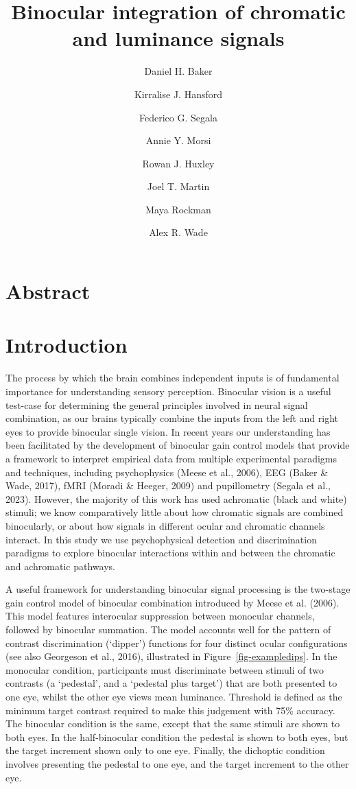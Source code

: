 \documentclass[
  letterpaper,
  DIV=11,
  numbers=noendperiod]{scrartcl}
\title{Binocular integration of chromatic and luminance signals}
\author{Daniel H. Baker \and Kirralise J. Hansford \and Federico G.
Segala \and Annie Y. Morsi \and Rowan J. Huxley \and Joel T.
Martin \and Maya Rockman \and Alex R. Wade}
\date{}
\begin{document}
\maketitle
\hypertarget{abstract}{%
\section{Abstract}\label{abstract}}

\hypertarget{introduction}{%
\section{Introduction}\label{introduction}}

The process by which the brain combines independent inputs is of
fundamental importance for understanding sensory perception. Binocular
vision is a useful test-case for determining the general principles
involved in neural signal combination, as our brains typically combine
the inputs from the left and right eyes to provide binocular single
vision. In recent years our understanding has been facilitated by the
development of binocular gain control models that provide a framework to
interpret empirical data from multiple experimental paradigms and
techniques, including psychophysics (Meese et al., 2006), EEG (Baker \&
Wade, 2017), fMRI (Moradi \& Heeger, 2009) and pupillometry (Segala et
al., 2023). However, the majority of this work has used achromatic
(black and white) stimuli; we know comparatively little about how
chromatic signals are combined binocularly, or about how signals in
different ocular and chromatic channels interact. In this study we use
psychophysical detection and discrimination paradigms to explore
binocular interactions within and between the chromatic and achromatic
pathways.

A useful framework for understanding binocular signal processing is the
two-stage gain control model of binocular combination introduced by
Meese et al. (2006). This model features interocular suppression between
monocular channels, followed by binocular summation. The model accounts
well for the pattern of contrast discrimination (`dipper') functions for
four distinct ocular configurations (see also Georgeson et al., 2016),
illustrated in Figure~\ref{fig-exampledips}. In the monocular condition,
participants must discriminate between stimuli of two contrasts (a
`pedestal', and a `pedestal plus target') that are both presented to one
eye, whilst the other eye views mean luminance. Threshold is defined as
the minimum target contrast required to make this judgement with 75\%
accuracy. The binocular condition is the same, except that the same
stimuli are shown to both eyes. In the half-binocular condition the
pedestal is shown to both eyes, but the target increment shown only to
one eye. Finally, the dichoptic condition involves presenting the
pedestal to one eye, and the target increment to the other eye.
\end{document}
